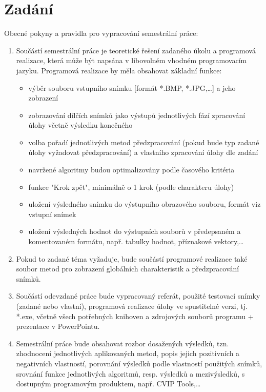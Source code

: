 \documentclass[12pt, a4paper]{report}
\begin{document}
\chapter{Zadání}
Obecné pokyny a pravidla pro vypracování semestrální práce:
\begin{enumerate}
	\item Součástí semestrální práce je teoretické řešení zadaného úkolu a programová realizace, která může být napsána v libovolném vhodném programovacím jazyku. Programová realizace by měla obsahovat základní funkce:
	\begin{itemize}
		\item{výběr souboru vstupního snímku [formát *.BMP, *.JPG,…] a jeho zobrazení}
		\item{zobrazování dílčích snímků jako výstupů jednotlivých fází zpracování úlohy včetně výsledku konečného}
		\item{volba pořadí jednotlivých metod předzpracování (pokud bude typ zadané úlohy vyžadovat
předzpracování) a vlastního zpracování úlohy dle zadání}
		\item{navržené algoritmy budou optimalizovány podle časového kritéria}
		\item{funkce "Krok zpět", minimálně o 1 krok (podle charakteru úlohy)}
		\item{uložení výsledného snímku do výstupního obrazového souboru, formát viz vstupní snímek}
		\item{uložení výsledných hodnot do výstupních souborů v předepsaném a komentovaném formátu,
např. tabulky hodnot, příznakové vektory,…}
	\end{itemize}
\item{Pokud to zadané téma vyžaduje, bude součástí programové realizace také soubor metod pro
zobrazení globálních charakteristik a předzpracování snímků.}		
\item{Součástí odevzdané práce bude vypracovaný referát, použité testovací snímky (zadané nebo
vlastní), programová realizace úlohy ve spustitelné verzi, tj. *.exe, včetně všech potřebných
knihoven a zdrojových souborů programu + prezentace v PowerPointu.}
\item{Semestrální práce bude obsahovat rozbor dosažených výsledků, tzn. zhodnocení jednotlivých
aplikovaných metod, popis jejich pozitivních a negativních vlastností, porovnání výsledků podle
vlastností použitých snímků, srovnání funkce jednotlivých algoritmů, resp. výsledků
a mezivýsledků, s dostupným programovým produktem, např. CVIP Tools,…}
\end{enumerate}
\end{document}
